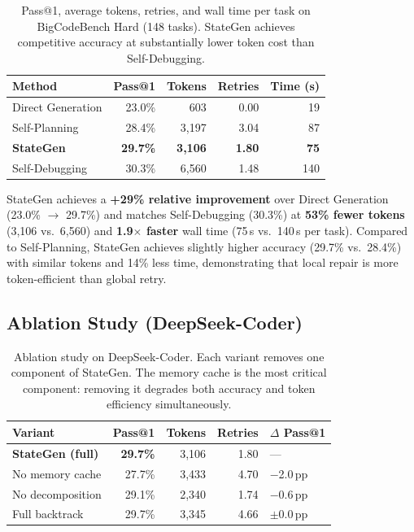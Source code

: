 \documentclass[11pt,twocolumn]{article}
\begin{document}
\begin{table}[H]
\centering
\caption{Pass@1, average tokens, retries, and wall time per task on
BigCodeBench Hard (148 tasks). StateGen achieves competitive accuracy at
substantially lower token cost than Self-Debugging.}
\label{tab:main}
\setlength{\tabcolsep}{5pt}
\begin{tabular}{lrrrr}
\toprule
\textbf{Method} & \textbf{Pass@1} & \textbf{Tokens} & \textbf{Retries} & \textbf{Time (s)} \\
\midrule
Direct Generation & 23.0\% & 603    & 0.00 & 19  \\
Self-Planning     & 28.4\% & 3,197  & 3.04 & 87  \\
\textbf{StateGen} & \textbf{29.7\%} & \textbf{3,106} & \textbf{1.80} & \textbf{75} \\
Self-Debugging    & 30.3\% & 6,560  & 1.48 & 140 \\
\bottomrule
\end{tabular}
\end{table}

StateGen achieves a \textbf{+29\% relative improvement} over Direct
Generation (23.0\% $\to$ 29.7\%) and matches Self-Debugging (30.3\%) at
\textbf{53\% fewer tokens} (3,106 vs.\ 6,560) and \textbf{1.9$\times$ faster}
wall time (75\,s vs.\ 140\,s per task).
Compared to Self-Planning, StateGen achieves slightly higher accuracy
(29.7\% vs.\ 28.4\%) with similar tokens and 14\% less time, demonstrating
that local repair is more token-efficient than global retry.

\subsection{Ablation Study (DeepSeek-Coder)}

\begin{table}[H]
\centering
\caption{Ablation study on DeepSeek-Coder. Each variant removes one
component of StateGen. The memory cache is the most critical component:
removing it degrades both accuracy and token efficiency simultaneously.}
\label{tab:ablation}
\setlength{\tabcolsep}{4pt}
\begin{tabular}{lrrrl}
\toprule
\textbf{Variant} & \textbf{Pass@1} & \textbf{Tokens} & \textbf{Retries} & \textbf{$\Delta$ Pass@1} \\
\midrule
\textbf{StateGen (full)}  & \textbf{29.7\%} & 3,106 & 1.80 & --- \\
No memory cache           & 27.7\%          & 3,433 & 4.70 & $-$2.0\,pp \\
No decomposition          & 29.1\%          & 2,340 & 1.74 & $-$0.6\,pp \\
Full backtrack            & 29.7\%          & 3,345 & 4.66 & $\pm$0.0\,pp \\
\bottomrule
\end{tabular}
\end{table}
\end{document}
